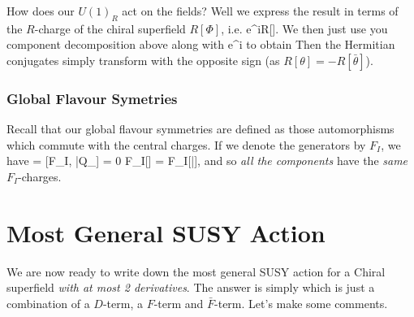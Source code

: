 How does our $U(1)_R$ act on the fields? Well we express the result in terms of the $R$-charge of the chiral superfield $R[\Phi]$, i.e. 
\bse 
    \Phi \mapsto e^{iR[\Phi]\a}\Phi.
\ese 
We then just use you component decomposition above along with 
\bse 
    \theta  \mapsto e^{i\a} \theta
\ese 
to obtain
\noindent Then the Hermitian conjugates simply transform with the opposite sign (as $R[\theta]=-R[\bar{\theta}]$). 

\subsubsection{Global Flavour Symetries}

Recall that our global flavour symmetries are defined as those automorphisms which commute with the central charges. If we denote the generators by $F_I$, we have
\bse 
    [F_I, Q_{\a}] = [F_I, \bar{Q}_{\dot{\a}}] = 0 \qquad \implies \qquad F_I[\theta] = F_I[\bar{\theta}],
\ese 
and so \textit{all the components} have the \textit{same} $F_I$-charges.

\section{Most General SUSY Action}
\label{sec:MostGeneralSUSYAction}

We are now ready to write down the most general SUSY action for a Chiral superfield \textit{with at most 2 derivatives}. The answer is simply
\noindent which is just a combination of a $D$-term, a $F$-term and $\bar{F}$-term. Let's make some comments.

